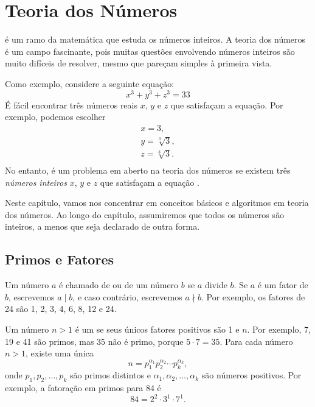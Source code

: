 \chapter{Teoria dos Números}


 é um ramo da matemática que estuda os números inteiros. A teoria dos números é um campo fascinante, pois muitas questões envolvendo números inteiros são muito difíceis de resolver, mesmo que pareçam simples à primeira vista.

Como exemplo, considere a seguinte equação:
\[x^3 + y^3 + z^3 = 33\]
É fácil encontrar três números reais $x$, $y$ e $z$ que satisfaçam a equação. Por exemplo, podemos escolher
\[
\begin{array}{lcl}
x = 3, \\
y = \sqrt[3]{3}, \\
z = \sqrt[3]{3}.\\
\end{array}
\]
No entanto, é um problema em aberto na teoria dos números se existem três \emph{números inteiros} $x$, $y$ e $z$ que satisfaçam a equação \cite{bec07}.

Neste capítulo, vamos nos concentrar em conceitos básicos e algoritmos em teoria dos números. Ao longo do capítulo, assumiremos que todos os números são inteiros, a menos que seja declarado de outra forma.

\section{Primos e Fatores}


Um número $a$ é chamado de  ou  de um número $b$ se $a$ divide $b$. Se $a$ é um fator de $b$, escrevemos $a \mid b$, e caso contrário, escrevemos $a \nmid b$. Por exemplo, os fatores de 24 são 1, 2, 3, 4, 6, 8, 12 e 24.


Um número $n>1$ é um  se seus únicos fatores positivos são 1 e $n$. Por exemplo, 7, 19 e 41 são primos, mas 35 não é primo, porque $5 \cdot 7 = 35$. Para cada número $n>1$, existe uma única 
\[ n = p_1^{\alpha_1} p_2^{\alpha_2} \cdots p_k^{\alpha_k},\]
onde $p_1,p_2,\ldots,p_k$ são primos distintos e $\alpha_1,\alpha_2,\ldots,\alpha_k$ são números positivos. Por exemplo, a fatoração em primos para 84 é
\[84 = 2^2 \cdot 3^1 \cdot 7^1.\]

